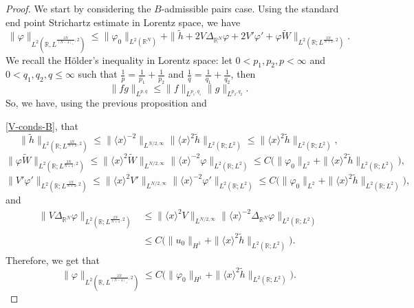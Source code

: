 \documentclass[10pt,leqno]{amsart}
\numberwithin{equation}{section}
\newcommand{\field}[1]{\mathbb{#1}}
\newcommand{\R}{\field{R}}          		%
\begin{document}
\begin{proof}
We start by considering the $B$-admissible pairs case.
Using the standard end point Strichartz estimate in Lorentz space, we have
\begin{equation}
\label{stripausa}
\|\varphi\|_{L^2 (\R, L^{\frac{2N}{(N-4)_+},2 })} \leq \|\varphi_0\|_{L^2 (\R^N)} + \| \tilde{h} + 2V\Delta_{\R^N} \varphi +2V' \varphi' +\varphi\tilde{W}\|_{L^2 (\R; L^{\frac{2N}{N+4} ,2})}. 
\end{equation}
We recall the H\"older's inequality in Lorentz space: let $0<p_1,p_2,p<\infty$ and  $0<q_1,q_2, q \leq \infty$ such that  $\frac{1}{p}= \frac{1}{p_1}+\frac{1}{p_2}$ and  $\frac{1}{q}=\frac{1}{q_1}+\frac{1}{q_2}$, then
$$\|fg\|_{L^{p,q}} \leq \|f\|_{L^{p_1,q_1}}\|g\|_{L^{p_2 , q_2}}.$$
So, we have, using the previous proposition and 

\eqref{V-conds-B},  
that
$$ \| \tilde{h} \|_{L^2 (\R ; L^{\frac{2N}{N+4} ,2})} \leq \|\langle x\rangle ^{-2}\|_{L^{N/2,\infty}} \|\langle x\rangle^2  \tilde{h}\|_{L^2 (\R ; L^2)}\leq  \|\langle x\rangle^2  \tilde{h}\|_{L^2 (\R ; L^2)},$$
$$ \| \varphi\tilde{W} \|_{L^2 (\R ; L^{\frac{2N}{N+4} ,2})} \leq \|\langle x\rangle^2 \tilde{W}\|_{L^{N/2,\infty}} \|\langle x\rangle ^{-2} \varphi\|_{L^2 (\R ; L^2)}\leq C \big(\|\varphi_0\|_{L^2 } + \|\langle x\rangle^2  \tilde{h}\|_{L^2 (\R ; L^2)}\big), $$
$$ \| V' \varphi' \|_{L^2 (\R ; L^{\frac{2N}{N+4} ,2})} \leq \|\langle x\rangle^2 V' \|_{L^{N/2,\infty}} \|\langle x\rangle ^{-2} \varphi' \|_{L^2 (\R ; L^2)}\leq C \big(\|\varphi_0\|_{L^2} + \|\langle x\rangle^2  \tilde{h}\|_{L^2 (\R ; L^2)}\big) ,$$
and
\begin{align*}
 \| V\Delta_{\R^N} \varphi \|_{L^2 (\R ; L^{\frac{2N}{N+4} ,2})}& \leq \|\langle x\rangle^2 V \|_{L^{N/2,\infty}} \|\langle x\rangle ^{-2} \Delta_{\R^N} \varphi \|_{L^2 (\R ; L^2)} \\
&\leq C  \big(\|u_0\|_{H^1} + \|\langle x\rangle^2  \tilde{h}\|_{L^2 (\R ; L^2)}\big) .
\end{align*}
Therefore, we get that
\begin{equation}
\label{endpointstr}
\|\varphi\|_{L^2 (\R , L^{\frac{2N}{(N-4)_+},2 })} \leq  C  \big(\|\varphi_0\|_{H^1} + \|\langle x\rangle^2  \tilde{h}\|_{L^2 (\R ; L^2)}\big) .

\end{equation}
\end{proof}
\end{document}
